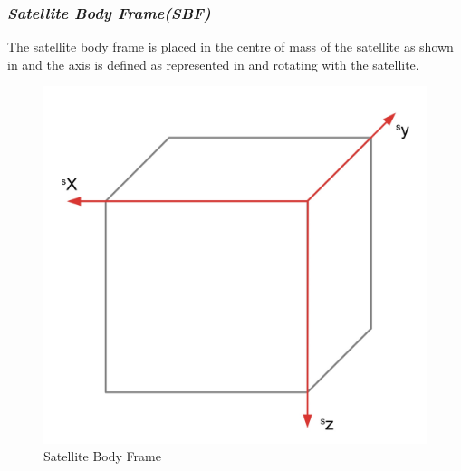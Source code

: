 \subsubsection{\textit{Satellite Body Frame(SBF)}}
The satellite body frame is placed in the centre of mass of the satellite as shown in   and the axis is defined as represented in  and rotating with the satellite.
\begin{figure}[H]
\centering
\includegraphics[width=0.4\linewidth]{figures/frames}
\caption{Satellite Body Frame}
\label{fig:refframes}
\end{figure}
